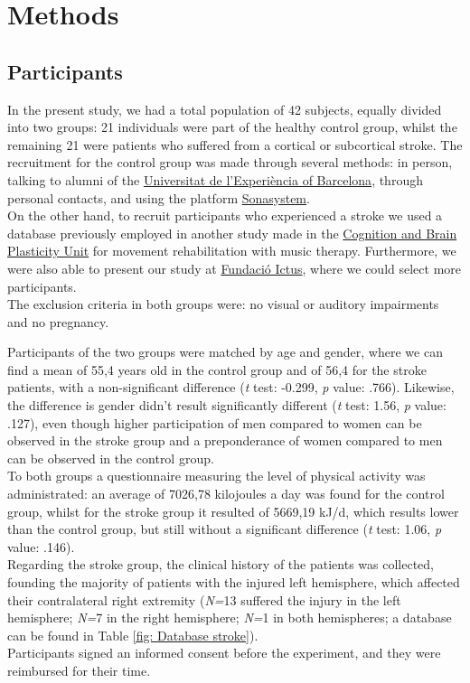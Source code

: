 \chapter{Methods}
\section{Participants}
In the present study, we had a total population of 42 subjects, equally divided into two groups: 21 individuals were part of the healthy control group, whilst the remaining 21 were patients who suffered from a cortical or subcortical stroke. The recruitment for the control group was made through several methods: in person, talking to alumni of the \href{https://www.experiencia.ub.edu/ca/}{Universitat de l'Experiència of Barcelona}, through personal contacts, and using the platform \href{https://www.sona-systems.com/}{Sonasystem}. \\
On the other hand, to recruit participants who experienced a stroke we used a database previously employed in another study made in the \href{https://brainvitge.org/}{Cognition and Brain Plasticity Unit} for movement rehabilitation with music therapy. Furthermore, we were also able to present our study at \href{https://www.fundacioictus.com/}{Fundació Ictus}, where we could select more participants. \\ 
The exclusion criteria in both groups were: no visual or auditory impairments and no pregnancy.

Participants of the two groups were matched by age and gender, where we can find a mean of 55,4 years old in the control group and of 56,4 for the stroke patients, with a non-significant difference (\textit{t} test: -0.299, \textit{p} value: .766). Likewise, the difference is gender didn't result significantly different (\textit{t} test: 1.56, \textit{p} value: .127), even though higher participation of men compared to women can be observed in the stroke group and a preponderance of women compared to men can be observed in the control group.\\ 
To both groups a questionnaire measuring the level of physical activity was administrated: an average of 7026,78 kilojoules a day was found for the control group, whilst for the stroke group it resulted of 5669,19 kJ/d, which results lower than the control group, but still without a significant difference (\textit{t} test: 1.06, \textit{p} value: .146). \\
Regarding the stroke group, the clinical history of the patients was collected, founding the majority of patients with the injured left hemisphere, which affected their contralateral right extremity (\textit{N=}13 suffered the injury in the left hemisphere; \textit{N=}7 in the right hemisphere; \textit{N=}1 in both hemispheres; a database can be found in Table \ref{fig: Database stroke}).\\ 
Participants signed an informed consent before the experiment, and they were reimbursed for their time. 

